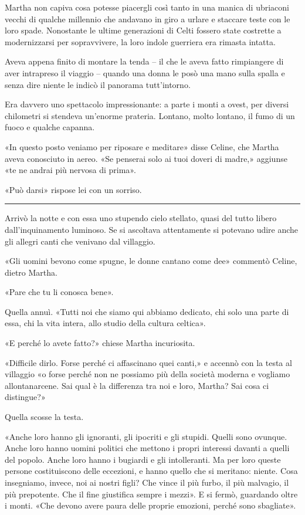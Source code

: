\documentclass[a4paper,10pt]{memoir}
\begin{document}
Martha non capiva cosa potesse piacergli così tanto in una manica di ubriaconi vecchi di qualche millennio che andavano
in giro a urlare e staccare teste con le loro spade. Nonostante le ultime generazioni di Celti fossero state costrette a
modernizzarsi per sopravvivere, la loro indole guerriera era rimasta intatta.

Aveva appena finito di montare la tenda -- il che le aveva fatto rimpiangere di aver intrapreso il viaggio -- quando una
donna le posò una mano sulla spalla e senza dire niente le indicò il panorama tutt'intorno.

Era davvero uno spettacolo impressionante: a parte i monti a ovest, per diversi chilometri si stendeva un'enorme
prateria. Lontano, molto lontano, il fumo di un fuoco e qualche capanna.

«In questo posto veniamo per riposare e meditare» disse Celine, che Martha aveva conosciuto in aereo. «Se penserai solo
ai tuoi doveri di madre,» aggiunse «te ne andrai più nervosa di prima».

«Può darsi» rispose lei con un sorriso.

\plainbreak{1}

Arrivò la notte e con essa uno stupendo cielo stellato, quasi del tutto libero dall'inquinamento luminoso. Se si
ascoltava attentamente si potevano udire anche gli allegri canti che venivano dal villaggio.

«Gli uomini bevono come spugne, le donne cantano come dee» commentò Celine, dietro Martha.

«Pare che tu li conosca bene».

Quella annuì. «Tutti noi che siamo qui abbiamo dedicato, chi solo una parte di essa, chi la vita intera, allo studio
della cultura celtica».

«E perché lo avete fatto?» chiese Martha incuriosita.

«Difficile dirlo. Forse perché ci affascinano quei canti,» e accennò con la testa al villaggio «o forse perché non ne
possiamo più della società moderna e vogliamo allontanarcene. Sai qual è la differenza tra noi e loro, Martha? Sai cosa
ci distingue?»

Quella scosse la testa.

«Anche loro hanno gli ignoranti, gli ipocriti e gli stupidi. Quelli sono ovunque. Anche loro hanno uomini politici che
mettono i propri interessi davanti a quelli del popolo. Anche loro hanno i bugiardi e gli intolleranti. Ma per loro
queste persone costituiscono delle eccezioni, e hanno quello che si meritano: niente. Cosa insegniamo, invece, noi ai
nostri figli? Che vince il più furbo, il più malvagio, il più prepotente. Che il fine giustifica sempre i mezzi». E si
fermò, guardando oltre i monti. «Che devono avere paura delle proprie emozioni, perché sono sbagliate».
\end{document}
